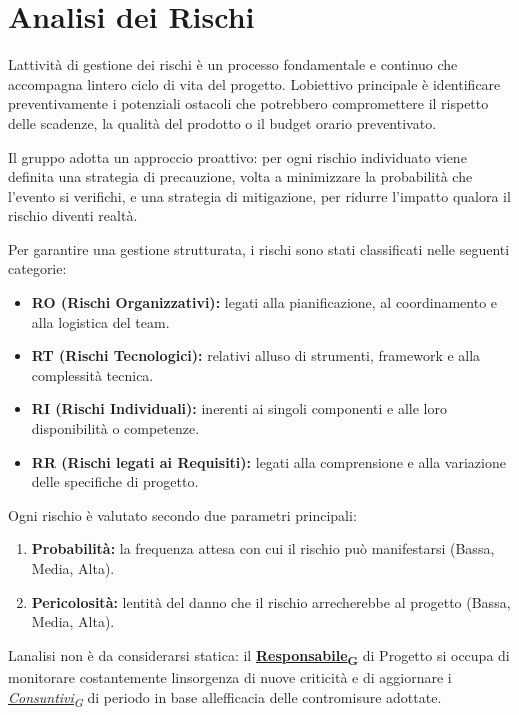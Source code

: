 \documentclass[12pt, a4paper]{article}
\newcommand{\urlglossario}{https://skynetunigroup.github.io/Code_Guardian/Documentazione/RTB/glossario_v1.0.0.pdf} %
\newcommand{\glo}[2]{\href{\urlglossario\#nameddest=#2}{#1\textsubscript{G}}}
\begin{document}
\newpage
\section{Analisi dei Rischi}

L\textquotesingle attività di gestione dei rischi è un processo
fondamentale e continuo che accompagna l\textquotesingle intero ciclo di
vita del progetto.
L\textquotesingle obiettivo principale è identificare
preventivamente i potenziali ostacoli che potrebbero compromettere il
rispetto delle scadenze, la qualità del prodotto o il budget orario
preventivato.

Il gruppo adotta un approccio proattivo: per ogni rischio individuato
viene definita una strategia di precauzione, volta a minimizzare la probabilità che l'evento si verifichi, e una strategia di mitigazione, per ridurre l'impatto qualora il rischio diventi realtà.

Per garantire una gestione strutturata, i rischi sono stati classificati
nelle seguenti categorie:

\begin{itemize}
\item
  \textbf{RO (Rischi Organizzativi):} legati alla pianificazione, al
  coordinamento e alla logistica del team.
\item
  \textbf{RT (Rischi Tecnologici):} relativi all\textquotesingle uso di
  strumenti, framework e alla complessità tecnica.
\item
  \textbf{RI (Rischi Individuali):} inerenti ai singoli componenti e
  alle loro disponibilità o competenze.
\item
  \textbf{RR (Rischi legati ai Requisiti):} legati alla comprensione e
  alla variazione delle specifiche di progetto.
\end{itemize}

Ogni rischio è valutato secondo due parametri principali:

\begin{enumerate}
\def\labelenumi{\arabic{enumi}.}
\item
  \textbf{Probabilità:} la frequenza attesa con cui il rischio può
  manifestarsi (Bassa, Media, Alta).
\item
  \textbf{Pericolosità:} l\textquotesingle entità del danno che il
  rischio arrecherebbe al progetto (Bassa, Media, Alta).
\end{enumerate}

L\textquotesingle analisi non è da considerarsi statica: il
\textbf{\glo{Responsabile}{responsabile}} di Progetto si occupa di monitorare costantemente
l\textquotesingle insorgenza di nuove criticità e di aggiornare i
\textit{\glo{Consuntivi}{consuntivo}} di periodo in base all\textquotesingle efficacia delle
contromisure adottate.
\newpage
\end{document}
